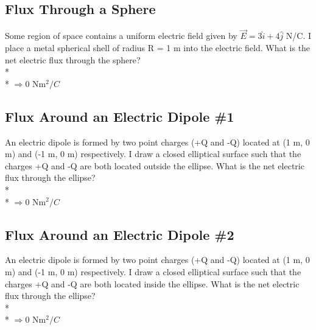 \documentclass[11pt]{article}
\begin{document}
\subsection{Flux Through a Sphere}
Some region of space contains a uniform electric field given by $\vec{E} = 3\hat{i} + 4\hat{j}$ N/C.  I place a metal spherical shell of radius R = 1 m into the electric field.  What is the net electric flux through the sphere? \\* \\*
$\Rightarrow 0$ Nm$^2/C$

\subsection{Flux Around an Electric Dipole \#1}
An electric dipole is formed by two point charges (+Q and -Q) located at (1 m, 0 m) and (-1 m, 0 m) respectively.  I draw a closed elliptical surface such that the charges +Q and -Q are both located outside the ellipse.  What is the net electric flux through the ellipse? \\* \\*
$\Rightarrow 0$ Nm$^2/C$

\subsection{Flux Around an Electric Dipole \#2}
An electric dipole is formed by two point charges (+Q and -Q) located at (1 m, 0 m) and (-1 m, 0 m) respectively.  I draw a closed elliptical surface such that the charges +Q and -Q are both located inside the ellipse.  What is the net electric flux through the ellipse? \\* \\*
$\Rightarrow 0$ Nm$^2/C$

\end{document}
